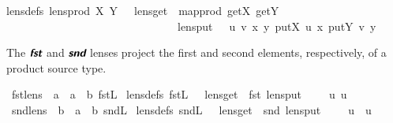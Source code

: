 \begin{isabellebody}
{\isacharbrackleft}lens{\isacharunderscore}defs{\isacharbrackright}{\isacharcolon}\ {\isachardoublequoteopen}lens{\isacharunderscore}prod\ X\ Y\ {\isacharequal}\ {\isasymlparr}\ lens{\isacharunderscore}get\ {\isacharequal}\ map{\isacharunderscore}prod\ get\isactrlbsub X\isactrlesub \ get\isactrlbsub Y\isactrlesub \isanewline
\ \ \ \ \ \ \ \ \ \ \ \ \ \ \ \ \ \ \ \ \ \ \ \ \ \ \ \ \ \ {\isacharcomma}\ lens{\isacharunderscore}put\ {\isacharequal}\ {\isasymlambda}\ {\isacharparenleft}u{\isacharcomma}\ v{\isacharparenright}\ {\isacharparenleft}x{\isacharcomma}\ y{\isacharparenright}{\isachardot}\ {\isacharparenleft}put\isactrlbsub X\isactrlesub \ u\ x{\isacharcomma}\ put\isactrlbsub Y\isactrlesub \ v\ y{\isacharparenright}\ {\isasymrparr}{\isachardoublequoteclose}%
\begin{isamarkuptext}%
The $\textit{\textsf{\textbf{fst}}}$ and $\textit{\textsf{\textbf{snd}}}$ lenses project the first and second elements, respectively, of a 
  product source type.%
\end{isamarkuptext}\isamarkuptrue%
\isamarkupfalse%
\ fst{\isacharunderscore}lens\ {\isacharcolon}{\isacharcolon}\ {\isachardoublequoteopen}{\isacharprime}a\ {\isasymLongrightarrow}\ {\isacharprime}a\ {\isasymtimes}\ {\isacharprime}b{\isachardoublequoteclose}\ {\isacharparenleft}{\isachardoublequoteopen}fst\isactrlsub L{\isachardoublequoteclose}{\isacharparenright}\ \isanewline
{\isacharbrackleft}lens{\isacharunderscore}defs{\isacharbrackright}{\isacharcolon}\ {\isachardoublequoteopen}fst\isactrlsub L\ {\isacharequal}\ {\isasymlparr}\ lens{\isacharunderscore}get\ {\isacharequal}\ fst{\isacharcomma}\ lens{\isacharunderscore}put\ {\isacharequal}\ {\isacharparenleft}{\isasymlambda}\ {\isacharparenleft}{\isasymsigma}{\isacharcomma}\ {\isasymrho}{\isacharparenright}\ u{\isachardot}\ {\isacharparenleft}u{\isacharcomma}\ {\isasymrho}{\isacharparenright}{\isacharparenright}\ {\isasymrparr}{\isachardoublequoteclose}\isanewline
\isanewline
{}\isamarkupfalse%
\ snd{\isacharunderscore}lens\ {\isacharcolon}{\isacharcolon}\ {\isachardoublequoteopen}{\isacharprime}b\ {\isasymLongrightarrow}\ {\isacharprime}a\ {\isasymtimes}\ {\isacharprime}b{\isachardoublequoteclose}\ {\isacharparenleft}{\isachardoublequoteopen}snd\isactrlsub L{\isachardoublequoteclose}{\isacharparenright}\ \isanewline
{\isacharbrackleft}lens{\isacharunderscore}defs{\isacharbrackright}{\isacharcolon}\ {\isachardoublequoteopen}snd\isactrlsub L\ {\isacharequal}\ {\isasymlparr}\ lens{\isacharunderscore}get\ {\isacharequal}\ snd{\isacharcomma}\ lens{\isacharunderscore}put\ {\isacharequal}\ {\isacharparenleft}{\isasymlambda}\ {\isacharparenleft}{\isasymsigma}{\isacharcomma}\ {\isasymrho}{\isacharparenright}\ u{\isachardot}\ {\isacharparenleft}{\isasymsigma}{\isacharcomma}\ u{\isacharparenright}{\isacharparenright}\ {\isasymrparr}{\isachardoublequoteclose}\isanewline

\end{isabellebody}
